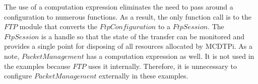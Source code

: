 The use of a computation expression eliminates the need to pass around a configuration to numerous functions. As a result, the only function call is to the $FTP$ module that converts the $FtpConfiguration$ to a $FtpSession$. The $FtpSession$ is a handle so that the state of the transfer can be monitored and provides a single point for disposing of all resources allocated by MCDTPi. As a note, $PacketManagement$ has a computation expression as well. It is not used in the examples because $FTP$ uses it internally. Therefore, it is unnecessary to configure $PacketManagement$ externally in these examples.